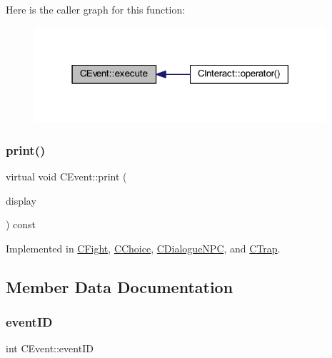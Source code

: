Here is the caller graph for this function\+:\nopagebreak
\begin{figure}[H]
\begin{center}
\leavevmode
\includegraphics[width=307pt]{class_c_event_a46bd2925f7f19c5c0d6adf2b1e6e3f70_icgraph}
\end{center}
\end{figure}
\mbox{\label{class_c_event_ad6f75aa0babcd74caff9426cecdd86f0}} 
\subsubsection{\texorpdfstring{print()}{print()}}
{\footnotesize\ttfamily virtual void C\+Event\+::print (\begin{DoxyParamCaption}\item[{const \mbox{\hyperlink{class_c_display}{C\+Display}} \&}]{display }\end{DoxyParamCaption}) const\hspace{0.3cm}{\ttfamily [pure virtual]}}



Implemented in \mbox{\hyperlink{class_c_fight_a70c350b815744b481134b4d3ac0f61bb}{C\+Fight}}, \mbox{\hyperlink{class_c_choice_a5280ff7c539ed8c8a4007ac38822d9b9}{C\+Choice}}, \mbox{\hyperlink{class_c_dialogue_n_p_c_a1deb79509daa19585916a308c9b42e9c}{C\+Dialogue\+N\+PC}}, and \mbox{\hyperlink{class_c_trap_a64aba41bb1f7578d10e347358273acf4}{C\+Trap}}.



\subsection{Member Data Documentation}
\mbox{\label{class_c_event_a606d5ce523c07656aae583232d496052}} 
\subsubsection{\texorpdfstring{event\+ID}{eventID}}
{\footnotesize\ttfamily int C\+Event\+::event\+ID\hspace{0.3cm}{\ttfamily [protected]}}

